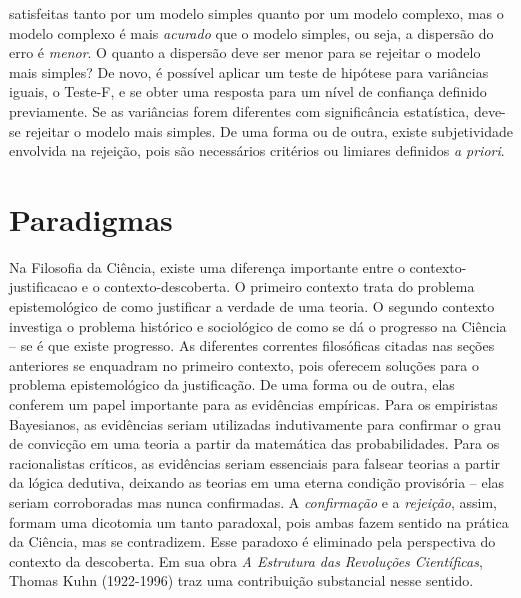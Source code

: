\documentclass[./main.tex]{subfiles}
\begin{document}
satisfeitas tanto por um modelo simples quanto por um modelo complexo, mas o modelo complexo é mais \textit{acurado} que o modelo simples, ou seja, a dispersão do erro é \textit{menor}. O quanto a dispersão deve ser menor para se rejeitar o modelo mais simples? De novo, é possível aplicar um teste de hipótese para variâncias iguais, o Teste-F, e se obter uma resposta para um nível de confiança definido previamente. Se as variâncias forem diferentes com significância estatística, deve-se rejeitar o modelo mais simples. De uma forma ou de outra, existe subjetividade envolvida na rejeição, pois são necessários critérios ou limiares definidos \textit{a priori}.

\section{Paradigmas} \label{episteme:kuhn}

\par Na Filosofia da Ciência, existe uma diferença importante entre o \gls{contexto-justificacao} e o \gls{contexto-descoberta}. O primeiro contexto trata do problema epistemológico de como justificar a verdade de uma teoria. O segundo contexto investiga o problema histórico e sociológico de como se dá o progresso na Ciência – se é que existe progresso. As diferentes correntes filosóficas citadas nas seções anteriores se enquadram no primeiro contexto, pois oferecem soluções para o problema epistemológico da justificação. De uma forma ou de outra, elas conferem um papel importante para as evidências empíricas. Para os empiristas Bayesianos, as evidências seriam utilizadas indutivamente para confirmar o grau de convicção em uma teoria a partir da matemática das probabilidades. Para os racionalistas críticos, as evidências seriam essenciais para falsear teorias a partir da lógica dedutiva, deixando as teorias em uma eterna condição provisória – elas seriam corroboradas mas nunca confirmadas. A \textit{confirmação} e a \textit{rejeição}, assim, formam uma dicotomia um tanto paradoxal, pois ambas fazem sentido na prática da Ciência, mas se contradizem. Esse paradoxo é eliminado pela perspectiva do contexto da descoberta. Em sua obra \textit{A Estrutura das Revoluções Científicas}, Thomas Kuhn (1922-1996) traz uma contribuição substancial nesse sentido. 
\end{document}
